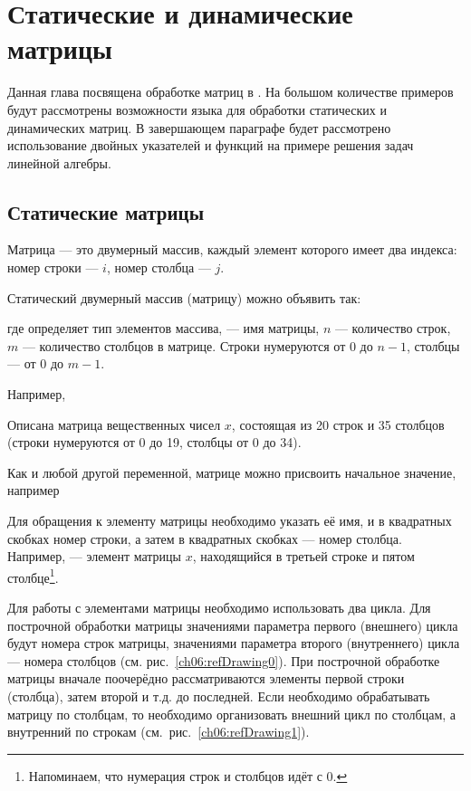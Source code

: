 \chapter[Статические и динамические матрицы]{Статические и динамические матрицы}\label{ch06}
Данная глава посвящена обработке матриц в . 
На большом количестве примеров будут рассмотрены возможности языка для
обработки статических и динамических матриц. 
В завершающем параграфе будет рассмотрено использование двойных указателей
и функций на примере решения задач линейной алгебры.

\section[Статические матрицы \Sys{С(С++)}]{Статические матрицы }
Матрица --- это двумерный массив, каждый элемент которого имеет два индекса: номер строки --- $i$, номер столбца --- $j$. 

Статический двумерный массив (матрицу) можно объявить так:


где  определяет тип элементов массива,  --- имя матрицы, $n$ --- количество строк, $m$ --- количество столбцов в матрице. Строки нумеруются от 0 до $n-1$, столбцы --- от 0 до $m-1$.

Например, 


Описана матрица вещественных чисел $x$, состоящая из 20 строк и 35 столбцов 
(строки нумеруются от 0 до 19, столбцы от 0 до 34).

Как и любой другой переменной, матрице можно присвоить начальное значение, например 

Для обращения к элементу матрицы необходимо указать её имя, и в квадратных скобках номер строки, а затем в квадратных
скобках --- номер столбца. Например,  --- элемент матрицы $x$, находящийся в третьей строке и пятом
столбце\footnote{Напоминаем, что нумерация строк и столбцов идёт с 0.}.

Для работы с элементами матрицы необходимо использовать два цикла. Для построчной обработки матрицы значениями параметра
первого (внешнего) цикла будут номера строк матрицы, значениями параметра второго (внутреннего) цикла --- номера столбцов
(см. рис.~\ref{ch06:refDrawing0}). При построчной обработке матрицы вначале поочерёдно рассматриваются элементы первой
строки (столбца), затем второй и т.д. до последней. Если необходимо обрабатывать матрицу по столбцам, то необходимо
организовать внешний цикл по столбцам, а внутренний по строкам (см.~рис.~\ref{ch06:refDrawing1}).

